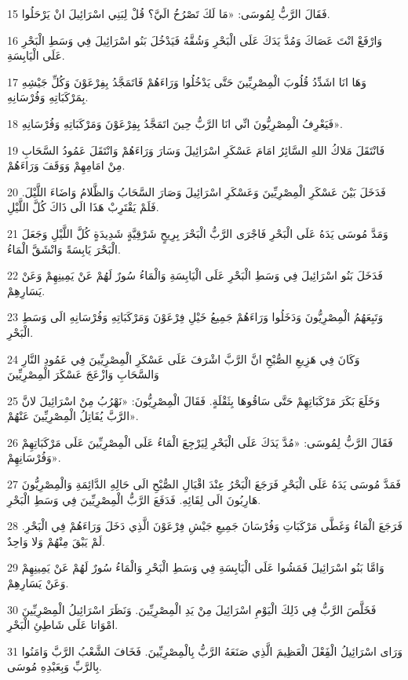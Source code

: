 \par 15 فَقَالَ الرَّبُّ لِمُوسَى: «مَا لَكَ تَصْرُخُ الَيَّ؟ قُلْ لِبَنِي اسْرَائِيلَ انْ يَرْحَلُوا.
\par 16 وَارْفَعْ انْتَ عَصَاكَ وَمُدَّ يَدَكَ عَلَى الْبَحْرِ وَشُقَّهُ فَيَدْخُلَ بَنُو اسْرَائِيلَ فِي وَسَطِ الْبَحْرِ عَلَى الْيَابِسَةِ.
\par 17 وَهَا انَا اشَدِّدُ قُلُوبَ الْمِصْرِيِّينَ حَتَّى يَدْخُلُوا وَرَاءَهُمْ فَاتَمَجَّدُ بِفِرْعَوْنَ وَكُلِّ جَيْشِهِ بِمَرْكَبَاتِهِ وَفُرْسَانِهِ.
\par 18 فَيَعْرِفُ الْمِصْرِيُّونَ انِّي انَا الرَّبُّ حِينَ اتَمَجَّدُ بِفِرْعَوْنَ وَمَرْكَبَاتِهِ وَفُرْسَانِهِ».
\par 19 فَانْتَقَلَ مَلاكُ اللهِ السَّائِرُ امَامَ عَسْكَرِ اسْرَائِيلَ وَسَارَ وَرَاءَهُمْ وَانْتَقَلَ عَمُودُ السَّحَابِ مِنْ امَامِهِمْ وَوَقَفَ وَرَاءَهُمْ.
\par 20 فَدَخَلَ بَيْنَ عَسْكَرِ الْمِصْرِيِّينَ وَعَسْكَرِ اسْرَائِيلَ وَصَارَ السَّحَابُ وَالظَّلامُ وَاضَاءَ اللَّيْلَ. فَلَمْ يَقْتَرِبْ هَذَا الَى ذَاكَ كُلَّ اللَّيْلِ.
\par 21 وَمَدَّ مُوسَى يَدَهُ عَلَى الْبَحْرِ فَاجْرَى الرَّبُّ الْبَحْرَ بِرِيحٍ شَرْقِيَّةٍ شَدِيدَةٍ كُلَّ اللَّيْلِ وَجَعَلَ الْبَحْرَ يَابِسَةً وَانْشَقَّ الْمَاءُ.
\par 22 فَدَخَلَ بَنُو اسْرَائِيلَ فِي وَسَطِ الْبَحْرِ عَلَى الْيَابِسَةِ وَالْمَاءُ سُورٌ لَهُمْ عَنْ يَمِينِهِمْ وَعَنْ يَسَارِهِمْ.
\par 23 وَتَبِعَهُمُ الْمِصْرِيُّونَ وَدَخَلُوا وَرَاءَهُمْ جَمِيعُ خَيْلِ فِرْعَوْنَ وَمَرْكَبَاتِهِ وَفُرْسَانِهِ الَى وَسَطِ الْبَحْرِ.
\par 24 وَكَانَ فِي هَزِيعِ الصُّبْحِ انَّ الرَّبَّ اشْرَفَ عَلَى عَسْكَرِ الْمِصْرِيِّينَ فِي عَمُودِ النَّارِ وَالسَّحَابِ وَازْعَجَ عَسْكَرَ الْمِصْرِيِّينَ
\par 25 وَخَلَعَ بَكَرَ مَرْكَبَاتِهِمْ حَتَّى سَاقُوهَا بِثَقْلَةٍ. فَقَالَ الْمِصْرِيُّونَ: «نَهْرُبُ مِنْ اسْرَائِيلَ لانَّ الرَّبَّ يُقَاتِلُ الْمِصْرِيِّينَ عَنْهُمْ».
\par 26 فَقَالَ الرَّبُّ لِمُوسَى: «مُدَّ يَدَكَ عَلَى الْبَحْرِ لِيَرْجِعَ الْمَاءُ عَلَى الْمِصْرِيِّينَ عَلَى مَرْكَبَاتِهِمْ وَفُرْسَانِهِمْ».
\par 27 فَمَدَّ مُوسَى يَدَهُ عَلَى الْبَحْرِ فَرَجَعَ الْبَحْرُ عِنْدَ اقْبَالِ الصُّبْحِ الَى حَالِهِ الدَّائِمَةِ وَالْمِصْرِيُّونَ هَارِبُونَ الَى لِقَائِهِ. فَدَفَعَ الرَّبُّ الْمِصْرِيِّينَ فِي وَسَطِ الْبَحْرِ.
\par 28 فَرَجَعَ الْمَاءُ وَغَطَّى مَرْكَبَاتِ وَفُرْسَانَ جَمِيعِ جَيْشِ فِرْعَوْنَ الَّذِي دَخَلَ وَرَاءَهُمْ فِي الْبَحْرِ. لَمْ يَبْقَ مِنْهُمْ وَلا وَاحِدٌ.
\par 29 وَامَّا بَنُو اسْرَائِيلَ فَمَشُوا عَلَى الْيَابِسَةِ فِي وَسَطِ الْبَحْرِ وَالْمَاءُ سُورٌ لَهُمْ عَنْ يَمِينِهِمْ وَعَنْ يَسَارِهِمْ.
\par 30 فَخَلَّصَ الرَّبُّ فِي ذَلِكَ الْيَوْمِ اسْرَائِيلَ مِنْ يَدِ الْمِصْرِيِّينَ. وَنَظَرَ اسْرَائِيلُ الْمِصْرِيِّينَ امْوَاتا عَلَى شَاطِئِ الْبَحْرِ.
\par 31 وَرَاى اسْرَائِيلُ الْفَِعْلَ الْعَظِيمَ الَّذِي صَنَعَهُ الرَّبُّ بِالْمِصْرِيِّينَ. فَخَافَ الشَّعْبُ الرَّبَّ وَامَنُوا بِالرَّبِّ وَبِعَبْدِهِ مُوسَى.

